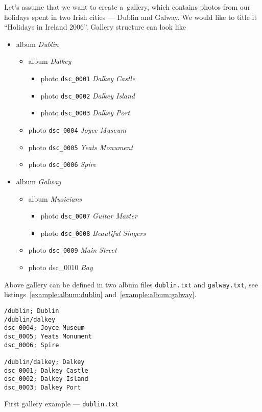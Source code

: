 \documentclass{article}
\begin{document}
Let's assume that we want to create a~gallery, which contains photos from
our holidays spent in two Irish cities --- Dublin and Galway. We would like
to title it ``Holidays in Ireland 2006''. Gallery structure can look like
\begin{multicols}{2}
\begin{itemize}
\item album \textit{Dublin}
    \begin{itemize}
    \item album \textit{Dalkey}
        \begin{itemize}
        \item photo \texttt{dsc\_0001} \textit{Dalkey Castle}
        \item photo \texttt{dsc\_0002} \textit{Dalkey Island}
        \item photo \texttt{dsc\_0003} \textit{Dalkey Port}
        \end{itemize}
    \item photo \texttt{dsc\_0004} \textit{Joyce Museum}
    \item photo \texttt{dsc\_0005} \textit{Yeats Monument}
    \item photo \texttt{dsc\_0006} \textit{Spire}
    \end{itemize}
\columnbreak
\item album \textit{Galway}
    \begin{itemize}
    \item album \textit{Musicians}
        \begin{itemize}
        \item photo \texttt{dsc\_0007} \textit{Guitar Master}
        \item photo \texttt{dsc\_0008} \textit{Beautiful Singers}
        \end{itemize}
    \item photo \texttt{dsc\_0009} \textit{Main Street}
    \item photo dsc\_0010 \textit{Bay}
    \end{itemize}
\end{itemize}
\end{multicols}

Above gallery can be defined in two album files \texttt{dublin.txt} and
\texttt{galway.txt}, see listings~\ref{example:album:dublin}
and~\ref{example:album:galway}.

\begin{listing}
\begin{lstlisting}
/dublin; Dublin
/dublin/dalkey
dsc_0004; Joyce Museum
dsc_0005; Yeats Monument
dsc_0006; Spire

/dublin/dalkey; Dalkey
dsc_0001; Dalkey Castle
dsc_0002; Dalkey Island
dsc_0003; Dalkey Port
\end{lstlisting}
\caption{First gallery example --- \texttt{dublin.txt}}\label{example:album:dublin}
\end{listing}
\end{document}
